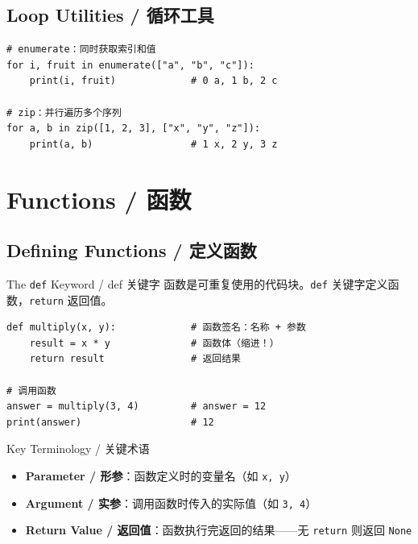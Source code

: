 \documentclass[11pt,a4paper]{report}
\let\oldtexttt\texttt
\renewcommand{\texttt}[1]{\textcolor{mainblue}{\oldtexttt{#1}}}
\begin{document}
\section{Loop Utilities / 循环工具}

\begin{lstlisting}
# enumerate：同时获取索引和值
for i, fruit in enumerate(["a", "b", "c"]):
    print(i, fruit)             # 0 a, 1 b, 2 c

# zip：并行遍历多个序列
for a, b in zip([1, 2, 3], ["x", "y", "z"]):
    print(a, b)                 # 1 x, 2 y, 3 z
\end{lstlisting}

\newpage

\chapter{Functions / 函数}

\section{Defining Functions / 定义函数}

\begin{concept}{The \texttt{def} Keyword / def 关键字}
函数是可重复使用的代码块。\texttt{def} 关键字定义函数，\texttt{return} 返回值。
\begin{lstlisting}
def multiply(x, y):             # 函数签名：名称 + 参数
    result = x * y              # 函数体（缩进！）
    return result               # 返回结果

# 调用函数
answer = multiply(3, 4)         # answer = 12
print(answer)                   # 12
\end{lstlisting}
\end{concept}

\begin{concept}{Key Terminology / 关键术语}
\begin{itemize}[itemsep=0.3em]
    \item \textbf{Parameter / 形参}：函数定义时的变量名（如 \texttt{x, y}）
    \item \textbf{Argument / 实参}：调用函数时传入的实际值（如 \texttt{3, 4}）
    \item \textbf{Return Value / 返回值}：函数执行完返回的结果——无 \texttt{return} 则返回 \texttt{None}
\end{itemize}
\end{concept}
\end{document}
